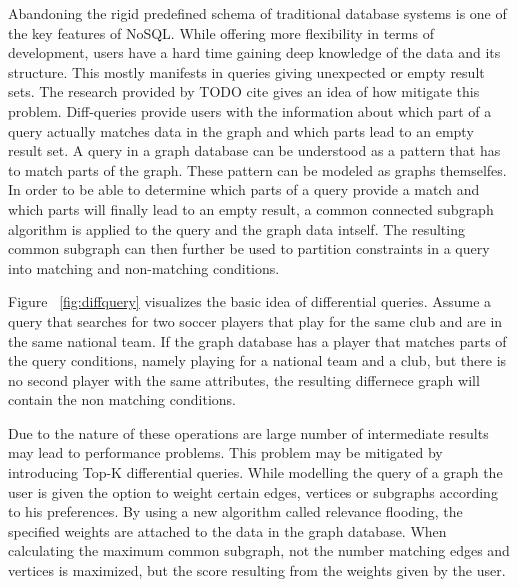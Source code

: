 \documentclass{sig-alternate}
\begin{document}
Abandoning the rigid predefined schema of traditional database systems is one of the 
key features of NoSQL. While offering more flexibility in terms of development,
users have a hard time gaining deep knowledge of the data and its structure.
This mostly manifests in queries giving unexpected or empty result sets.
The research provided by TODO cite gives an idea of how mitigate this problem.
Diff-queries provide users with the information about which part of a query actually
matches data in the graph and which parts lead to an empty result set.
A query in a graph database can be understood as a pattern that has to match parts of the graph.
These pattern can be modeled as graphs themselfes. 
In order to be able to determine which parts of a query provide a match
and which parts will finally lead to an empty result, a common connected subgraph algorithm is
applied to the query and the graph data intself.
The resulting common subgraph can then further be used to partition 
constraints in a query into matching and non-matching conditions.

Figure ~\ref{fig:diffquery} visualizes the basic idea of
differential queries. Assume a query that searches for two soccer 
players that play for the same club and are in the same national team.
If the graph database has a player that matches parts of the query conditions,
namely playing for a national team and a club, but there is no second player with the 
same attributes, the resulting differnece graph will contain the non matching conditions.

\begin{figure*}
\centering
{}
\caption{Differential graph for data and query}
\label{fig:diffquery}
\end{figure*}


Due to the nature of these operations are large number of intermediate results 
may lead to performance problems.
This problem may be mitigated by introducing Top-K differential queries. 
While modelling the query of a graph the user is given the option to weight 
certain edges, vertices or subgraphs according to his preferences.
By using a new algorithm called relevance flooding, the specified weights are 
attached to the data in the graph database.
When calculating the maximum common subgraph, not the number matching edges and
vertices is maximized, but the score resulting from the weights given by the user.
\end{document}
